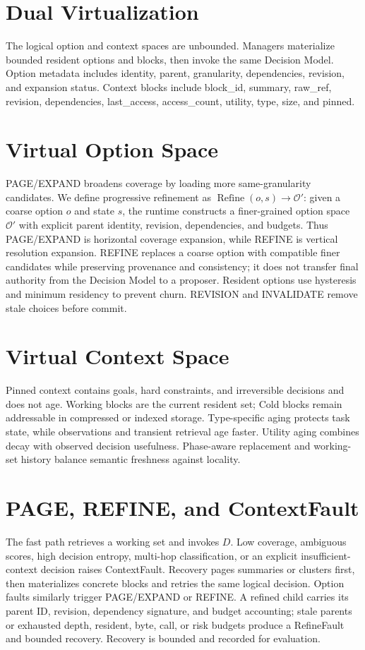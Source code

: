 \documentclass[11pt]{article}
\begin{document}
\section{Dual Virtualization}The logical option and context spaces are unbounded. Managers materialize bounded resident options and blocks, then invoke the same Decision Model. Option metadata includes identity, parent, granularity, dependencies, revision, and expansion status. Context blocks include block\_id, summary, raw\_ref, revision, dependencies, last\_access, access\_count, utility, type, size, and pinned.
\section{Virtual Option Space}PAGE/EXPAND broadens coverage by loading more same-granularity candidates. We define progressive refinement as $\operatorname{Refine}(o,s)\to\mathcal{O}'$: given a coarse option $o$ and state $s$, the runtime constructs a finer-grained option space $\mathcal{O}'$ with explicit parent identity, revision, dependencies, and budgets. Thus PAGE/EXPAND is horizontal coverage expansion, while REFINE is vertical resolution expansion. REFINE replaces a coarse option with compatible finer candidates while preserving provenance and consistency; it does not transfer final authority from the Decision Model to a proposer. Resident options use hysteresis and minimum residency to prevent churn. REVISION and INVALIDATE remove stale choices before commit.
\section{Virtual Context Space}Pinned context contains goals, hard constraints, and irreversible decisions and does not age. Working blocks are the current resident set; Cold blocks remain addressable in compressed or indexed storage. Type-specific aging protects task state, while observations and transient retrieval age faster. Utility aging combines decay with observed decision usefulness. Phase-aware replacement and working-set history balance semantic freshness against locality.
\section{PAGE, REFINE, and ContextFault}The fast path retrieves a working set and invokes $D$. Low coverage, ambiguous scores, high decision entropy, multi-hop classification, or an explicit insufficient-context decision raises ContextFault. Recovery pages summaries or clusters first, then materializes concrete blocks and retries the same logical decision. Option faults similarly trigger PAGE/EXPAND or REFINE. A refined child carries its parent ID, revision, dependency signature, and budget accounting; stale parents or exhausted depth, resident, byte, call, or risk budgets produce a RefineFault and bounded recovery. Recovery is bounded and recorded for evaluation.
\end{document}

